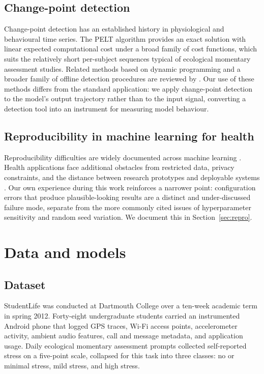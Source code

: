 \documentclass[preprint,12pt,authoryear]{elsarticle}
\begin{document}
\subsection{Change-point detection}

Change-point detection has an established history in physiological and
behavioural time series. The PELT algorithm \citep{killick2012} provides
an exact solution with linear expected computational cost under a broad
family of cost functions, which suits the relatively short per-subject
sequences typical of ecological momentary assessment studies. Related
methods based on dynamic programming \citep{jackson2005} and a broader
family of offline detection procedures are reviewed by
\citet{truong2020}. Our use of these methods differs from the standard
application: we apply change-point detection to the model's output
trajectory rather than to the input signal, converting a detection tool
into an instrument for measuring model behaviour.

\subsection{Reproducibility in machine learning for health}

Reproducibility difficulties are widely documented across machine
learning \citep{pineau2021}. Health applications face additional
obstacles from restricted data, privacy constraints, and the distance
between research prototypes and deployable systems
\citep{beam2018,futoma2020}. Our own experience during this work
reinforces a narrower point: configuration errors that produce
plausible-looking results are a distinct and under-discussed failure
mode, separate from the more commonly cited issues of hyperparameter
sensitivity and random seed variation. We document this in
Section~\ref{sec:repro}.

\section{Data and models}

\subsection{Dataset}

StudentLife \citep{wang2014} was conducted at Dartmouth College over a
ten-week academic term in spring 2012. Forty-eight undergraduate students
carried an instrumented Android phone that logged GPS traces, Wi-Fi
access points, accelerometer activity, ambient audio features, call and
message metadata, and application usage. Daily ecological momentary
assessment prompts collected self-reported stress on a five-point scale,
collapsed for this task into three classes: no or minimal stress, mild
stress, and high stress.
\end{document}
